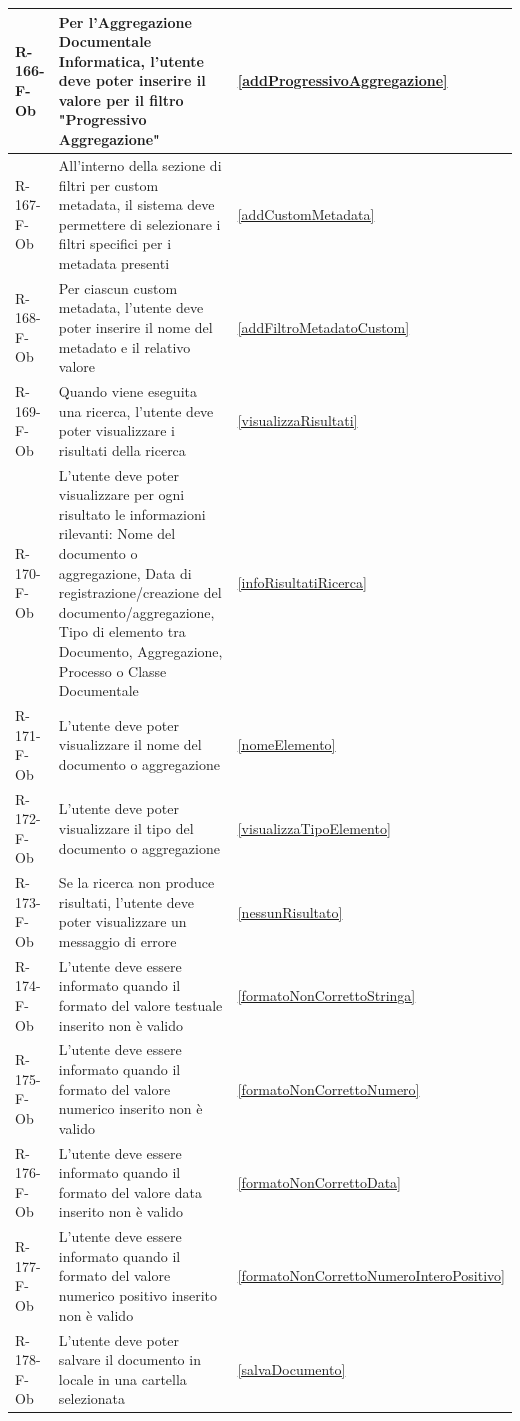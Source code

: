 \begin{longtable}{|p{2.5cm}|p{9.5cm}|p{2.5cm}|}
R-166-F-Ob & Per l'Aggregazione Documentale Informatica, l'utente deve poter inserire il valore per il filtro "Progressivo Aggregazione" & \ref{addProgressivoAggregazione} \\
\hline
R-167-F-Ob & All'interno della sezione di filtri per custom metadata, il sistema deve permettere di selezionare i filtri specifici per i metadata presenti & \ref{addCustomMetadata} \\
\hline
R-168-F-Ob & Per ciascun custom metadata, l'utente deve poter inserire il nome del metadato e il relativo valore & \ref{addFiltroMetadatoCustom} \\
\hline
R-169-F-Ob & Quando viene eseguita una ricerca, l'utente deve poter visualizzare i risultati della ricerca & \ref{visualizzaRisultati} \\
\hline
R-170-F-Ob & L'utente deve poter visualizzare per ogni risultato le informazioni rilevanti: Nome del documento o aggregazione, Data di registrazione/creazione del documento/aggregazione, Tipo di elemento tra Documento, Aggregazione, Processo o Classe Documentale & \ref{infoRisultatiRicerca} \\
\hline
R-171-F-Ob & L'utente deve poter visualizzare il nome del documento o aggregazione & \ref{nomeElemento} \\
\hline
R-172-F-Ob & L'utente deve poter visualizzare il tipo del documento o aggregazione & \ref{visualizzaTipoElemento} \\
\hline
R-173-F-Ob & Se la ricerca non produce risultati, l'utente deve poter visualizzare un messaggio di errore & \ref{nessunRisultato} \\
\hline
R-174-F-Ob & L'utente deve essere informato quando il formato del valore testuale inserito non è valido & \ref{formatoNonCorrettoStringa} \\
\hline
R-175-F-Ob & L'utente deve essere informato quando il formato del valore numerico inserito non è valido & \ref{formatoNonCorrettoNumero} \\
\hline
R-176-F-Ob & L'utente deve essere informato quando il formato del valore data inserito non è valido & \ref{formatoNonCorrettoData} \\
\hline
R-177-F-Ob & L'utente deve essere informato quando il formato del valore numerico positivo inserito non è valido & \ref{formatoNonCorrettoNumeroInteroPositivo} \\
\hline
R-178-F-Ob & L'utente deve poter salvare il documento in locale in una cartella selezionata & \ref{salvaDocumento} \\
\hline

\end{longtable}
